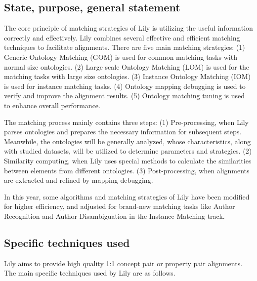 \documentclass{llncs}
\begin{document}
\subsection{State, purpose, general statement}
The core principle of matching strategies of Lily is utilizing the useful information correctly and effectively. Lily combines several effective and efficient matching techniques to facilitate alignments. There are five main matching strategies: (1) Generic Ontology Matching (GOM) is used for common matching tasks with normal size ontologies. (2) Large scale Ontology Matching (LOM) is used for the matching tasks with large size ontologies. (3) Instance Ontology Matching (IOM) is used for instance matching tasks. (4) Ontology mapping debugging is used to verify and improve the alignment results. (5) Ontology matching tuning is used to enhance overall performance. \par
The matching process mainly contains three steps: (1) Pre-processing, when Lily parses ontologies and prepares the necessary information for subsequent steps. Meanwhile, the ontologies will be generally analyzed, whose characteristics, along with studied datasets, will be utilized to determine parameters and strategies. (2) Similarity computing, when Lily uses special methods to calculate the similarities between elements from different ontologies. (3) Post-processing, when alignments are extracted and refined by mapping debugging. \par
In this year, some algorithms and matching strategies of Lily have been modified for higher efficiency, and adjusted for brand-new matching tasks like Author Recognition and Author Disambiguation in the Instance Matching track. \par

\subsection{Specific techniques used}
Lily aims to provide high quality 1:1 concept pair or property pair alignments. The main specific techniques used by Lily are as follows. \par
\end{document}
